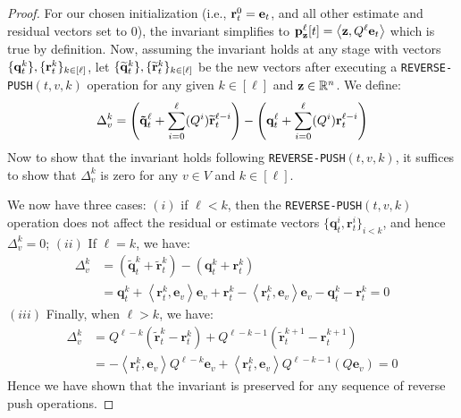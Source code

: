 \begin{proof}
For our chosen initialization (i.e., $\mathbf{r}^{0}_t = \mathbf{e}_t$, and all other estimate and residual vectors set to $0$), the invariant simplifies to $\mathbf{p}_{\mathbf{z}}^{\ell}[t] = \left< \mathbf{z} , Q^{\ell}\mathbf{e}_t \right>$ which is true by definition.
Now, assuming the invariant holds at any stage with vectors $\{\mathbf{q}^{k}_t\}, \{\mathbf{r}^{k}_t\}_{k\in[\ell]}$, let $\{\widetilde{\mathbf{q}}^{k}_t\}, \{\widetilde{\mathbf{r}}^{k}_t\}_{k\in[\ell]}$ be the new vectors after executing a \texttt{REVERSE-PUSH}$(t,v,k)$ operation for any given $k\in[\ell]$ and $\mathbf{z}\in\mathbb{R}^n$. We define:
$$\Delta_v^{k} = \left( \mathbf{\tilde{q}}_t^{\ell} + \sum_{i=0}^{\ell}  (Q^i)\widetilde{\mathbf{r}}^{\ell-i}_t \right)- \left( \mathbf{q}^{\ell}_t + \sum_{i=0}^{\ell}  (Q^i) \mathbf{r}_t^{\ell-i}\right)$$
Now to show that the invariant holds following \texttt{REVERSE-PUSH}$(t,v,k)$, it suffices to show that $\Delta_v^{k}$ is zero for any $v\in V$ and $k\in[\ell]$. 

We now have three cases: $(i)$ if $\ell < k$, then the \texttt{REVERSE-PUSH}$(t,v,k)$ operation does not affect the residual or estimate vectors $\{\mathbf{q}_t^{i},\mathbf{r}_t^{i}\}_{i<k}$, and hence 
$\Delta_v^k=0$;
$(ii)$ If $\ell = k$, we have:
\begin{align*}
\Delta_v^{k} &= \left( \mathbf{\tilde{q}}_t^{k} +  \mathbf{\tilde{r}}_t^{k}\right)- \left( \mathbf{q}_t^{k} + \mathbf{r}_t^{k}\right)\\
&= \mathbf{q}_t^{k} + \left<\mathbf{r}_t^{k}, \mathbf{e}_v \right>\mathbf{e}_v +  \mathbf{r}_t^{k} - \left<\mathbf{r}_t^{k}, \mathbf{e}_v \right>\mathbf{e}_v - \mathbf{q}_t^{k} - \mathbf{r}_t^{k}
= 0
\end{align*}
$(iii)$ Finally, when $\ell > k$, we have: 
\begin{align*}
\Delta_v^k &= Q^{\ell-k}\left( \mathbf{\tilde{r}}_t^k - \mathbf{r}_t^k \right) + Q^{\ell-k-1}\left( \mathbf{\tilde{r}}_t^{k+1} - \mathbf{r}_t^{k+1} \right)\\
&= -\left<\mathbf{r}_t^k, \mathbf{e}_v \right>Q^{\ell-k}\mathbf{e}_v  + \left<\mathbf{r}_t^k, \mathbf{e}_v \right>Q^{\ell-k-1}\left(Q\mathbf{e}_v \right)
= 0
\end{align*}
Hence we have shown that the invariant is preserved for any sequence of reverse push operations.
\end{proof}

